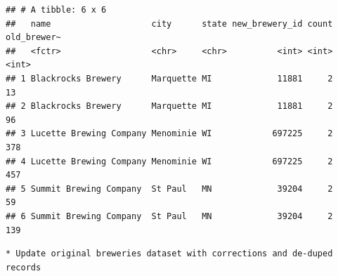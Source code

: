 \documentclass[]{article}
\newenvironment{Shaded}{\begin{snugshade}}{\end{snugshade}}
\newcommand{\KeywordTok}[1]{\textcolor[rgb]{0.13,0.29,0.53}{\textbf{#1}}}
\newcommand{\DataTypeTok}[1]{\textcolor[rgb]{0.13,0.29,0.53}{#1}}
\newcommand{\StringTok}[1]{\textcolor[rgb]{0.31,0.60,0.02}{#1}}
\newcommand{\CommentTok}[1]{\textcolor[rgb]{0.56,0.35,0.01}{\textit{#1}}}
\newcommand{\OperatorTok}[1]{\textcolor[rgb]{0.81,0.36,0.00}{\textbf{#1}}}
\newcommand{\NormalTok}[1]{#1}
\begin{document}
\begin{verbatim}
## # A tibble: 6 x 6
##   name                    city      state new_brewery_id count old_brewer~
##   <fctr>                  <chr>     <chr>          <int> <int>       <int>
## 1 Blackrocks Brewery      Marquette MI             11881     2          13
## 2 Blackrocks Brewery      Marquette MI             11881     2          96
## 3 Lucette Brewing Company Menominie WI            697225     2         378
## 4 Lucette Brewing Company Menominie WI            697225     2         457
## 5 Summit Brewing Company  St Paul   MN             39204     2          59
## 6 Summit Brewing Company  St Paul   MN             39204     2         139
\end{verbatim}

\begin{verbatim}
* Update original breweries dataset with corrections and de-duped records
\end{verbatim}

\begin{Shaded}
\end{Shaded}
\end{document}
